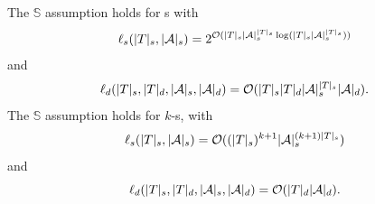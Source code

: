 \begin{lemma}\label{lem-spt}
The $\mathbb{S}$\prerec{} assumption holds for \SSPT{}s with 
$$\ell_s(|T|_s, |\mathcal{A}|_s) = 2^{\mathcal{O}( |T|_s |\mathcal{A}|_s^{|T|_s} \log (|T|_s |\mathcal{A}|_s^{|T|_s}))}$$ 
and  
$$\ell_d(|T|_s, |T|_d, |\mathcal{A}|_s, |\mathcal{A}|_d) = \mathcal{O}(|T|_s  |T|_d |\mathcal{A}|_s^{|T|_s} |\mathcal{A}|_d).$$ 
%
The $\mathbb{S}$\prerec{} assumption holds for $k$-\RBSSPT{}s, with 
$$\ell_s(|T|_s, |\mathcal{A}|_s) =\mathcal{O}( (|T|_s)^{k+1} |\mathcal{A}|_s^{(k+1)|T|_s})$$ 
and  
$$\ell_d(|T|_s, |T|_d, |\mathcal{A}|_s, |\mathcal{A}|_d) = \mathcal{O}(|T|_d |\mathcal{A}|_d).$$
%
\end{lemma}


